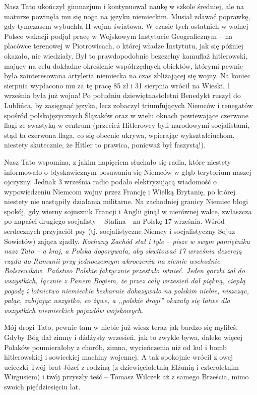 Nasz Tato ukończył gimnazjum i kontynuował naukę w szkole średniej, ale na maturze powinęła mu się noga na języku niemieckim. Musiał zdawać poprawkę, gdy tymczasem wybuchła II wojna światowa. W czasie tych ostatnich w wolnej Polsce wakacji podjął pracę w Wojskowym Instytucie Geograficznym -- na placówce terenowej w Piotrowicach, o której władze Instytutu, jak się później okazało, nie wiedziały. Był to prawdopodobnie bezczelny kamuflaż hitlerowski, mający na celu dokładne określenie współrzędnych obiektów, którymi pewnie była zainteresowana artyleria niemiecka na czas zbliżającej się wojny. Na koniec sierpnia wypłacono mu za tę pracę 85 zł i 31 sierpnia wrócił na Wieski. 1 września była już wojna! Po południu dziewiętnastoletni Benedykt ruszył do Lublińca, by zasięgnąć języka, lecz zobaczył triumfujących Niemców i renegatów spośród polskojęzycznych Ślązaków oraz w wielu oknach powiewające czerwone flagi ze swastyką w centrum (przecież Hitlerowcy byli narodowymi socjalistami, stąd ta czerwona flaga, co się obecnie ukrywa, wpierając wykształciuchom, niestety skutecznie, że Hitler to prawica, ponieważ był faszystą!).

Nasz Tato wspomina, z jakim napięciem słuchało się radia, które niestety informowało o błyskawicznym posuwaniu się Niemców w głąb terytorium naszej ojczyzny. Jednak 3 września radio podało elektryzującą wiadomość o wypowiedzeniu Niemcom wojny przez Francję i Wielką Brytanię, po której niestety nie nastąpiły działania militarne. Na zachodniej granicy Niemiec błogi spokój, gdy wierny sojusznik Francji i Anglii ginął w nierównej walce, zwłaszcza po napaści drugiego socjalisty – Stalina - na Polskę 17 września. Wśród serdecznych przyjaciół psy (tj. socjalistyczne Niemcy i socjalistyczny Sojuz Sowietów) zająca zjadły. \textit{Kochany Zachód stał i tyle – pisze w swym pamiętniku nasz Tato – a kraj, a Polska dogorywała, aby skwitować 17 września dezercją rządu do Rumunii przy jednoczesnym wkroczeniu na ziemie wschodnie Bolszewików. Państwo Polskie faktycznie przestało istnieć. Jeden gorzki żal do wszystkich, łącznie z Panem Bogiem, że przez cały wrzesień dał piękną, ciepłą pogodę i lotnictwo niemieckie bezkarnie dokazywało na polskim niebie, niszcząc, paląc, zabijając wszystko, co żywe, a ,,polskie drogi'' okazały się łatwe dla wszystkich niemieckich pojazdów wojskowych}. 

Mój drogi Tato, pewnie tam w niebie już wiesz teraz jak bardzo się myliłeś. Gdyby Bóg dał zimny i dżdżysty wrzesień, jak to zwykle bywa, daleko więcej Polaków poumierałoby z chorób, zimna, wycieńczenia niż od kul i bomb hitlerowskiej i sowieckiej machiny wojennej. A tak spokojnie wrócił z owej ucieczki Twój brat Józef z rodziną (z dziewięcioletnią Elżunią i czteroletnim Wirgusiem) i twój przyszły teść -- Tomasz Wilczek aż z samego Brześcia, mimo swoich pięćdziesięciu lat.

